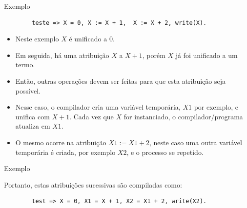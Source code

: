 \begin{frame}[fragile]

\begin{footnotesize}	
	\begin{block}{Exemplo}
		\begin{verbatim}
		teste => X = 0, X := X + 1,  X := X + 2, write(X).
		\end{verbatim}
		\begin{itemize}
		  \item Neste exemplo $X$ é unificado a $0$. 
		  
		  \item Em seguida, há uma atribuição $X$ a $X+1$, porém $X$ já foi unificado a um termo. 
		  
		  \item Então, outras operações devem ser feitas para que esta atribuição seja
		possível.
		
   \item	Nesse caso, o compilador  cria uma variável temporária, $X1$ por exemplo, e unifica com
		$X+1$. Cada vez que $X$ for instanciado, o compilador/programa atualiza em $X1$.
		
		\item	 O mesmo ocorre na atribuição $X1 := X1 + 2$, neste caso uma outra variável temporária é criada,  por exemplo	$X2$, e o processo se repetido.
	  
		\end{itemize}
			
	\end{block}

\end{footnotesize}


\end{frame}
	
	
	
\begin{frame}[fragile]
	
	\begin{block}{Exemplo}

	
		Portanto, estas atribuições sucessivas são compiladas como:
		\pause
		\begin{verbatim}
		test => X = 0, X1 = X + 1, X2 = X1 + 2, write(X2).
		\end{verbatim} 
		
	\end{block}
	
\end{frame}



